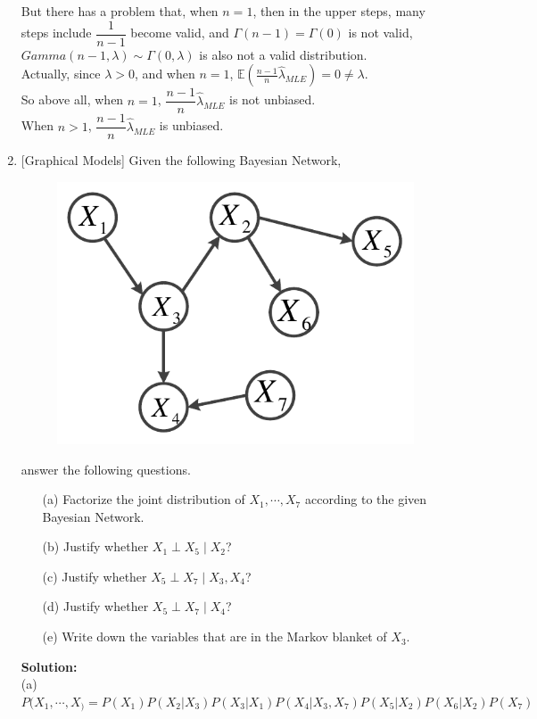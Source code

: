 \documentclass[10pt]{article}
\begin{document}
\begin{enumerate}[1.]
		  But there has a problem that, when $n=1$, then in the upper steps, many steps include $\dfrac{1}{n-1}$ become valid, and 
		  $\Gamma(n-1)=\Gamma(0)$ is not valid, $Gamma(n-1,\lambda)\sim\Gamma(0,\lambda)$ is also not a valid distribution.\\
		  Actually, since $\lambda>0$, and when $n=1$, $\mathbb{E}(\frac{n-1}{n}\hat{\lambda}_{MLE})=0\neq\lambda$.\\
		  
		  So above all, when $n=1$, $\dfrac{n-1}{n}\hat{\lambda}_{MLE}$ is not unbiased.\\
		  When $n>1$, $\dfrac{n-1}{n}\hat{\lambda}_{MLE}$ is unbiased.\\

      	  \newpage

	\item {} [Graphical Models]
	Given the following Bayesian Network, 
	\begin{figure}[h]
		\label{fig:bn}
		\vskip 0.2in
		\begin{center}
		\centerline{\includegraphics[width=0.4\columnwidth]{figures/bn}}
		\end{center}
		\vskip -0.2in
	\end{figure}

	answer the following questions.
		\begin{itemize}
			\item[(a)] Factorize the joint distribution of $X_{1},\cdots,X_{7}$ according 
			to the given Bayesian Network.~ 
			\item[(b)] Justify whether $X_{1}\perp X_{5}\mid X_{2}$?~ 
			\item[(c)] Justify whether $X_{5}\perp X_{7}\mid X_{3},X_{4}$?~ 
			\item[(d)] Justify whether $X_{5}\perp X_{7}\mid X_{4}$?~ 
			\item[(e)] Write down the variables that are in the Markov blanket of $X_{3}$.~ 
		\end{itemize}

		\textbf{Solution:}\\
		(a) $P(X_1,\cdots,X_)=P(X_1)P(X_2|X_3)P(X_3|X_1)P(X_4|X_3,X_7)P(X_5|X_2)P(X_6|X_2)P(X_7)$\\


\end{enumerate}
\end{document}
